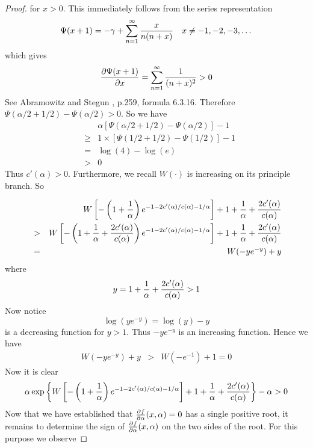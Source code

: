 \documentclass[11pt,a4]{amsart}
\newcommand{\pd}{\partial}
\newcommand{\1}{{\mathbf 1}}
\begin{document}
\begin{proof}
\begin{minipage}{0.5\textwidth}
    for $x > 0$. This immediately follows from the series
    representation
    \[
    \Psi(x + 1) = -\gamma + \sum_{n=1}^\infty {x \over n(n + x)}
    \quad x \neq -1, -2, -3,\dots
    \]
    which gives
    \[
    {\pd \Psi(x + 1) \over \pd x}
    = \sum_{n=1}^\infty {1 \over (n + x)^2} > 0
    \]
    See Abramowitz and Stegun \cite{abramowitz1972handbook}, p.259,
    formula 6.3.16. Therefore $\Psi(\alpha/2 + 1/2) - \Psi(\alpha/2) > 0$.
    So we have
    \begin{eqnarray*}
      && \alpha \left[
        \Psi(\alpha/2 + 1/2) - \Psi(\alpha/2)
      \right] - 1 \\
      &\geq& 1 \times \left[
        \Psi(1/2 + 1/2) - \Psi(1/2)
      \right] - 1 \\
      &=& \log(4) - \log(e) \\
      &>& 0
    \end{eqnarray*}
    Thus $c'(\alpha) > 0$. Furthermore, we recall
    $W(\cdot)$ is increasing on its principle branch. So
  \end{minipage}
  \begin{eqnarray*}
    &&
    W\left[
      -\left( 1 + {1 \over \alpha} \right)
      e^{-1 - 2 c'(\alpha)/c(\alpha) - 1/\alpha}
    \right]
    + 1 + {1 \over \alpha} + {2 c'(\alpha) \over c(\alpha)} \\
    &>& 
    W\left[
      -\left( 1 + {1 \over \alpha} + {2 c'(\alpha) \over c(\alpha)} \right)
      e^{-1 - 2 c'(\alpha)/c(\alpha) - 1/\alpha}
    \right]
    + 1 + {1 \over \alpha} + {2 c'(\alpha) \over c(\alpha)} \\
    &=& W(-y e^{-y}) + y
  \end{eqnarray*}
  where
  \[
  y = 1 + {1 \over \alpha} + {2 c'(\alpha) \over c(\alpha)} > 1
  \]
  Now notice
  \[
  \log(y e^{-y}) = \log(y) - y
  \]
  is a decreasing function for $y > 1$. Thus $-y e^{-y}$ is an
  increasing function. Hence we have
  \begin{eqnarray*}
    W(-y e^{-y}) + y &>& W(-e^{-1}) + 1 = 0
  \end{eqnarray*}
  Now it is clear
  \[
  \alpha\exp\left\{
    W\left[
      -\left(1 + {1 \over \alpha}\right)
      e^{-1 - 2 c'(\alpha)/c(\alpha) - 1/\alpha}
    \right]
    + 1 + {1 \over \alpha} + {2 c'(\alpha) \over c(\alpha)}
  \right\} - \alpha > 0
  \]
  Now that we have established that ${\pd f \over \pd \alpha}(x,
  \alpha) = 0$ has a single positive root, it remains to determine the
  sign of ${\pd f \over \pd \alpha}(x, \alpha)$ on the two sides of
  the root. For this purpose we observe

\end{proof}
\end{document}

